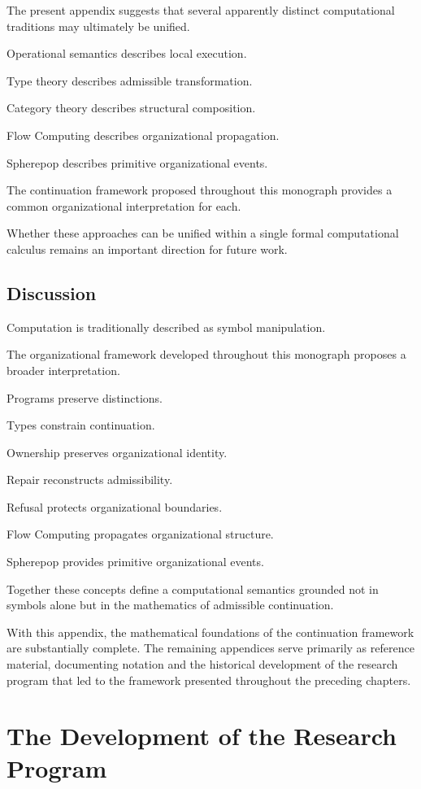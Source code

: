 \documentclass[11pt,oneside]{book}
\numberwithin{equation}{chapter}
\theoremstyle{definition}
\theoremstyle{plain}
\begin{document}
The present appendix suggests that several apparently distinct
computational traditions may ultimately be unified.

Operational semantics describes local execution.

Type theory describes admissible transformation.

Category theory describes structural composition.

Flow Computing describes organizational propagation.

Spherepop describes primitive organizational events.

The continuation framework proposed throughout this monograph provides a
common organizational interpretation for each.

Whether these approaches can be unified within a single formal
computational calculus remains an important direction for future work.

\section{Discussion}

Computation is traditionally described as symbol manipulation.

The organizational framework developed throughout this monograph proposes
a broader interpretation.

Programs preserve distinctions.

Types constrain continuation.

Ownership preserves organizational identity.

Repair reconstructs admissibility.

Refusal protects organizational boundaries.

Flow Computing propagates organizational structure.

Spherepop provides primitive organizational events.

Together these concepts define a computational semantics grounded not in
symbols alone but in the mathematics of admissible continuation.

With this appendix, the mathematical foundations of the continuation
framework are substantially complete. The remaining appendices serve
primarily as reference material, documenting notation and the historical
development of the research program that led to the framework presented
throughout the preceding chapters.

\chapter{The Development of the Research Program}
\label{app:research-program}
\end{document}
